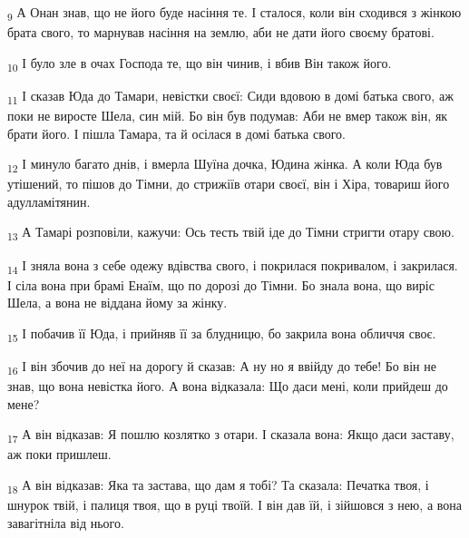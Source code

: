 \begin{tcolorbox}
\textsubscript{9} А Онан знав, що не його буде насіння те. І сталося, коли він сходився з жінкою брата свого, то марнував насіння на землю, аби не дати його своєму братові.
\end{tcolorbox}
\begin{tcolorbox}
\textsubscript{10} І було зле в очах Господа те, що він чинив, і вбив Він також його.
\end{tcolorbox}
\begin{tcolorbox}
\textsubscript{11} І сказав Юда до Тамари, невістки своєї: Сиди вдовою в домі батька свого, аж поки не виросте Шела, син мій. Бо він був подумав: Аби не вмер також він, як брати його. І пішла Тамара, та й осілася в домі батька свого.
\end{tcolorbox}
\begin{tcolorbox}
\textsubscript{12} І минуло багато днів, і вмерла Шуїна дочка, Юдина жінка. А коли Юда був утішений, то пішов до Тімни, до стрижіїв отари своєї, він і Хіра, товариш його адулламітянин.
\end{tcolorbox}
\begin{tcolorbox}
\textsubscript{13} А Тамарі розповіли, кажучи: Ось тесть твій іде до Тімни стригти отару свою.
\end{tcolorbox}
\begin{tcolorbox}
\textsubscript{14} І зняла вона з себе одежу вдівства свого, і покрилася покривалом, і закрилася. І сіла вона при брамі Енаїм, що по дорозі до Тімни. Бо знала вона, що виріс Шела, а вона не віддана йому за жінку.
\end{tcolorbox}
\begin{tcolorbox}
\textsubscript{15} І побачив її Юда, і прийняв її за блудницю, бо закрила вона обличчя своє.
\end{tcolorbox}
\begin{tcolorbox}
\textsubscript{16} І він збочив до неї на дорогу й сказав: А ну но я ввійду до тебе! Бо він не знав, що вона невістка його. А вона відказала: Що даси мені, коли прийдеш до мене?
\end{tcolorbox}
\begin{tcolorbox}
\textsubscript{17} А він відказав: Я пошлю козлятко з отари. І сказала вона: Якщо даси заставу, аж поки пришлеш.
\end{tcolorbox}
\begin{tcolorbox}
\textsubscript{18} А він відказав: Яка та застава, що дам я тобі? Та сказала: Печатка твоя, і шнурок твій, і палиця твоя, що в руці твоїй. І він дав їй, і зійшовся з нею, а вона завагітніла від нього.
\end{tcolorbox}
